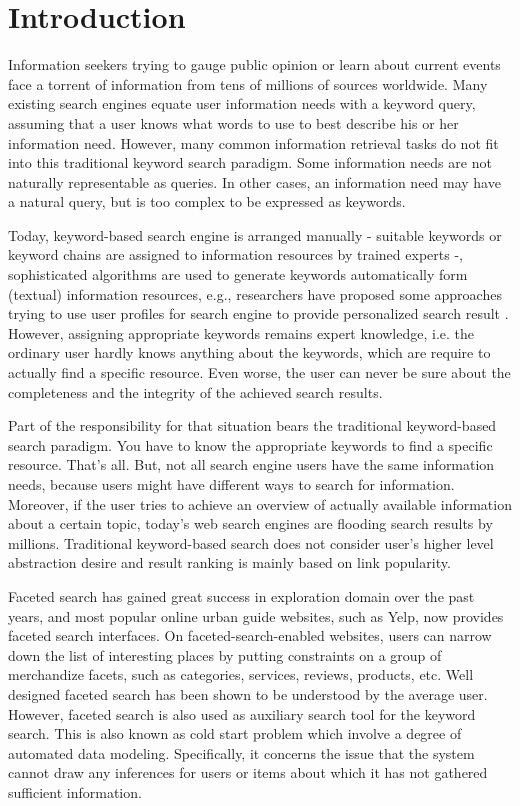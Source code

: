 \chapter{Introduction}
\label{introduction}

Information seekers trying to gauge public opinion or learn about current events face a torrent of information from tens of millions of sources worldwide. Many existing search engines equate user information needs with a keyword query, assuming that a user knows what words to use to best describe his or her information need. However, many common information retrieval tasks do not fit into this traditional keyword search paradigm. Some information needs are not naturally representable as queries. In other cases, an information need may have a natural query, but is too complex to be expressed as keywords. 

Today, keyword-based search engine is arranged manually - suitable keywords or keyword chains are assigned to information resources by trained experts -, sophisticated algorithms are used to generate keywords automatically form (textual) information resources, e.g., researchers have proposed some approaches trying to use user profiles for search engine to provide personalized search result \cite{Tan2006, Shen2005}. However, assigning appropriate keywords remains expert knowledge, i.e. the ordinary user hardly knows anything about the keywords, which are require to actually find a specific resource. Even worse, the user can never be sure about the completeness and the integrity of the achieved search results.

Part of the responsibility for that situation bears the traditional keyword-based search paradigm. You have to know the appropriate keywords to find a specific resource. That's all. But, not all search engine users have the same information needs, because users might have different ways to search for information. Moreover, if the user tries to achieve an overview of actually available information about a certain topic, today's web search engines are flooding search results by millions. Traditional keyword-based search does not consider user's higher level abstraction desire and result ranking is mainly based on link popularity.

Faceted search has gained great success in exploration domain over the past years, and most popular online urban guide websites, such as Yelp, now provides faceted search interfaces. On faceted-search-enabled websites, users can narrow down the list of interesting places by putting constraints on a group of merchandize facets, such as categories, services, reviews, products, etc. Well designed faceted search has been shown to be understood by the average user\cite{Hearst2009}.  However, faceted search is also used as auxiliary search tool for the keyword search. This is also known as cold start problem which involve a degree of automated data modeling. Specifically, it concerns the issue that the system cannot draw any inferences for users or items about which it has not gathered sufficient information. 

